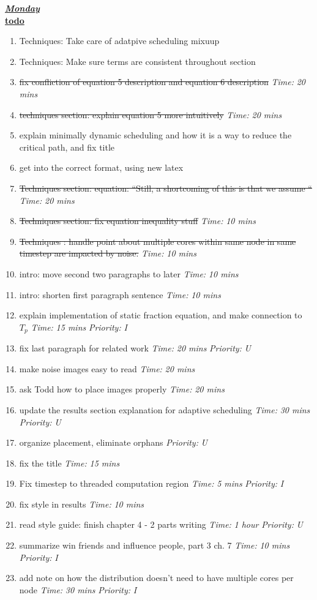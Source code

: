 \documentclass[11pt]{article}
\newcommand{\doneTask}[1]{\item \sout{#1}}
\newcommand{\timeEst}[1]{\textit{Time:} \textit{#1}}
\newcommand{\priority}[1]{\textit{Priority:} \textit{#1}}
\begin{document}
\underline{\textbf{\textit{Monday}}}\\
\underline{\textbf{todo}}\\
\begin{enumerate}

\item Techniques: Take care of adatpive scheduling mixuup
\item Techniques: Make sure terms are consistent throughout section
\doneTask{ fix confliction of equation 5 description and equation 6 description} \timeEst{20 mins}
\doneTask{ techniques section: explain equation 5 more intuitively}  \timeEst{20 mins}

\item explain minimally dynamic scheduling and how it is a way to reduce the critical path,  and fix title
\item get into the correct format, using new latex
\doneTask{ Techniques section: equation: ``Still, a shortcoming of this is that we assume  ``}  \timeEst{20 mins}
\doneTask{ Techniques section: fix equation inequality stuff } \timeEst{10 mins}

\doneTask{ Techniques : handle point about multiple cores within same node
in same timestep are impacted by noise.}  \timeEst{10 mins}

\item intro: move second two paragraphs to later \timeEst{10 mins}
\item intro: shorten first paragraph sentence \timeEst{10 mins}

\item explain implementation of static fraction equation, and make connection
to $T_p$ \timeEst{15 mins}  \priority{I}

\item fix last paragraph for related work \timeEst{20 mins} \priority{U}

\item make noise images easy to read \timeEst{20 mins}
\item ask Todd how to place images properly \timeEst{20 mins}

\item update the results section explanation for adaptive scheduling
\timeEst{30 mins} \priority{U}

\item organize placement, eliminate orphans \priority{U}
\item fix the title \timeEst{15 mins}

\item Fix timestep to threaded computation region \timeEst{5 mins}  \priority{I}

\item fix style in results \timeEst {10 mins}
\item read style guide:  finish chapter 4 - 2 parts writing \timeEst{1 hour} \priority{U}
\item summarize win friends and influence people, part 3 ch. 7 \timeEst{10 mins} \priority{I}


\item add note on how the distribution doesn't need to have multiple cores per node \timeEst{30 mins} \priority{I}
\end{enumerate}
\end{document}
